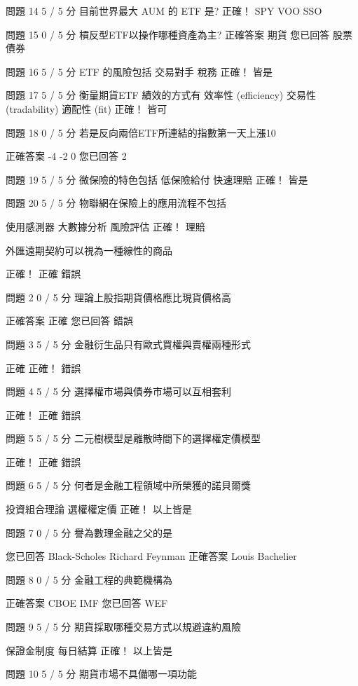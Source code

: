 問題 14
5 / 5 分
目前世界最大 AUM 的 ETF 是?
正確！
  SPY 
  VOO 
  SSO 
 
問題 15
0 / 5 分
槓反型ETF以操作哪種資產為主?
正確答案
  期貨 
您已回答
  股票 
  債券 
 
問題 16
5 / 5 分
ETF 的風險包括
  交易對手 
  稅務 
正確！
  皆是 
 
問題 17
5 / 5 分
衡量期貨ETF 績效的方式有
  效率性 (efficiency) 
  交易性 (tradability) 
  適配性 (fit) 
正確！
  皆可 
 
問題 18
0 / 5 分
若是反向兩倍ETF所連結的指數第一天上漲10%

正確答案
  -4%
  -2%
  0%
您已回答
  2%
 
問題 19
5 / 5 分
微保險的特色包括
  低保險給付 
  快速理賠 
正確！
  皆是 
 
問題 20
5 / 5 分
物聯網在保險上的應用流程不包括

  使用感測器 
  大數據分析 
  風險評估 
正確！
  理賠 
  
外匯遠期契約可以視為一種線性的商品

正確！
  正確 
  錯誤 
 
問題 2
0 / 5 分
理論上股指期貨價格應比現貨價格高

正確答案
  正確 
您已回答
  錯誤 
 
問題 3
5 / 5 分
金融衍生品只有歐式買權與賣權兩種形式

  正確 
正確！
  錯誤 
 
問題 4
5 / 5 分
選擇權市場與債券市場可以互相套利

正確！
  正確 
  錯誤 
 
問題 5
5 / 5 分
二元樹模型是離散時間下的選擇權定價模型

正確！
  正確 
  錯誤 
 
問題 6
5 / 5 分
何者是金融工程領域中所榮獲的諾貝爾獎

  投資組合理論 
  選權權定價 
正確！
  以上皆是 
 
問題 7
0 / 5 分
譽為數理金融之父的是

您已回答
  Black-Scholes 
  Richard Feynman 
正確答案
  Louis Bachelier 
 
問題 8
0 / 5 分
金融工程的典範機構為

正確答案
  CBOE 
  IMF 
您已回答
  WEF 
 
問題 9
5 / 5 分
期貨採取哪種交易方式以規避違約風險

  保證金制度 
  每日結算 
正確！
  以上皆是 
 
問題 10
5 / 5 分
期貨市場不具備哪一項功能

